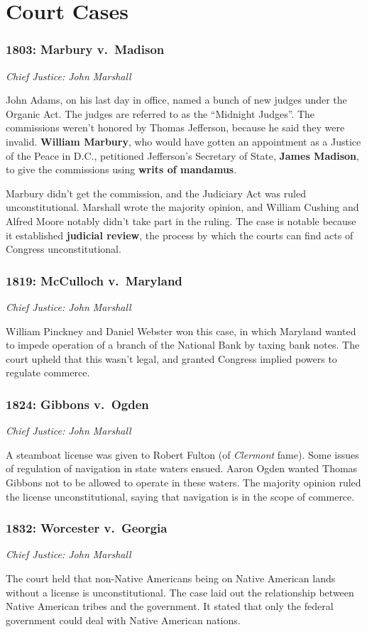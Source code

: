 \chapter{Court Cases}

\newcommand{\courtcase}[3]{%
  \subsection*{#2: #1}%
  \noindent\textit{Chief Justice: #3}%
}

\courtcase{Marbury v.\ Madison}{1803}{John Marshall}

John Adams, on his last day in office, named a bunch of new judges under the Organic Act.
The judges are referred to as the ``Midnight Judges''.
The commissions weren't honored by Thomas Jefferson, because he said they were invalid.
\textbf{William Marbury}, who would have gotten an appointment as a Justice of the Peace in D.C.,
petitioned Jefferson's Secretary of State, \textbf{James Madison},
to give the commissions using \textbf{writs of mandamus}.

Marbury didn't get the commission, and the Judiciary Act was ruled unconstitutional.
Marshall wrote the majority opinion, and William Cushing and Alfred Moore notably didn't take part in the ruling.
The case is notable because it established \textbf{judicial review},
the process by which the courts can find acts of Congress unconstitutional.

\courtcase{McCulloch v.\ Maryland}{1819}{John Marshall}

William Pinckney and Daniel Webster won this case,
in which Maryland wanted to impede operation of a branch of the National Bank by taxing bank notes.
The court upheld that this wasn't legal, and granted Congress implied powers to regulate commerce.

\courtcase{Gibbons v.\ Ogden}{1824}{John Marshall}

A steamboat license was given to Robert Fulton (of \textit{Clermont} fame).
Some issues of regulation of navigation in state waters ensued.
Aaron Ogden wanted Thomas Gibbons not to be allowed to operate in these waters.
The majority opinion ruled the license unconstitutional,
saying that navigation is in the scope of commerce.

\courtcase{Worcester v.\ Georgia}{1832}{John Marshall}

The court held that non-Native Americans being on Native American lands without a license is unconstitutional.
The case laid out the relationship between Native American tribes and the government.
It stated that only the federal government could deal with Native American nations.

